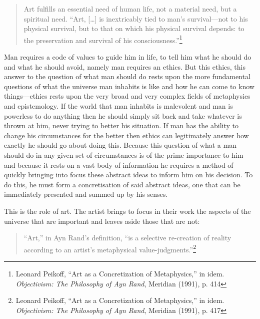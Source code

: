 \documentclass[11pt]{article}
\begin{document}
\begin{quote}
Art fulfills an essential need of human life, not a material need, but a spiritual need. ``Art, [\ldots{}] is inextricably tied to man's survival—not to his physical survival, but to that on which his physical survival depends: to the preservation and survival of his consciousness.''\footnote{Leonard Peikoff, ``Art as a Concretization of Metaphysics,'' in idem. \emph{Objectivism: The Philosophy of Ayn Rand}, Meridian (1991), p. 414}
\end{quote}

Man requires a code of values to guide him in life, to tell him what he should do and what he should avoid, namely man requires an ethics. But this ethics, this answer to the question of what man should do rests upon the more fundamental questions of what the universe man inhabits is like and how he can come to know things---ethics rests upon the very broad and very complex fields of metaphysics and epistemology. If the world that man inhabits is malevolent and man is powerless to do anything then he should simply sit back and take whatever is thrown at him, never trying to better his situation. If man has the ability to change his circumstances for the better then ethics can legitimately answer how exactly he should go about doing this. Because this question of what a man should do in any given set of circumstances is of the prime importance to him and because it rests on a vast body of information he requires a method of quickly bringing into focus these abstract ideas to inform him on his decision. To do this, he must form a concretisation of said abstract ideas, one that can be immediately presented and summed up by his senses.

This is the role of art. The artist brings to focus in their work the aspects of the universe that are important and leaves aside those that are not:
\begin{quote}
``Art,'' in Ayn Rand's definition, ``is a selective re-creation of reality according to an artist's metaphysical value-judgments.''\footnote{Leonard Peikoff, ``Art as a Concretization of Metaphysics,'' in idem. \emph{Objectivism: The Philosophy of Ayn Rand}, Meridian (1991), p. 417}
\end{quote}
\end{document}
